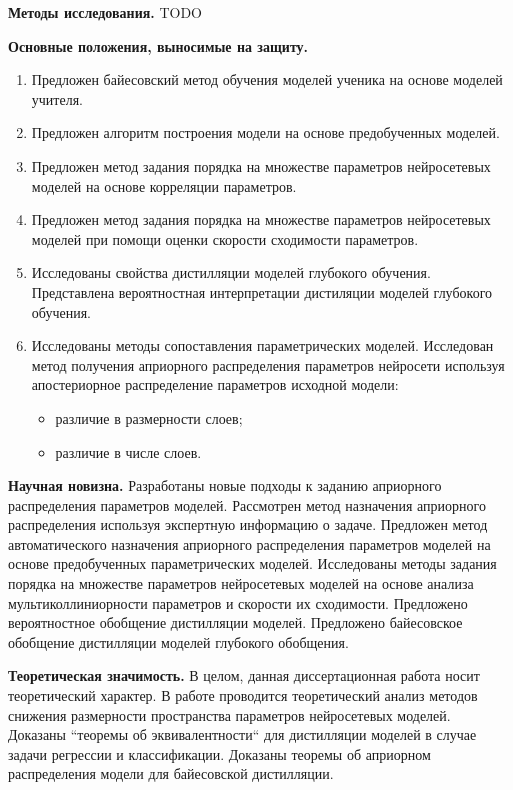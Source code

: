 \vspace{0.5cm}
\textbf{Методы исследования.} TODO

\vspace{0.5cm}
\textbf{Основные положения, выносимые на защиту.}
\vspace{0.3cm}
\begin{enumerate}
    \item Предложен байесовский метод обучения моделей ученика на основе моделей учителя.
    \item Предложен алгоритм построения модели на основе предобученных моделей.
    \item Предложен метод задания порядка на множестве параметров нейросетевых моделей на основе корреляции параметров.
    \item Предложен метод задания порядка на множестве параметров нейросетевых моделей при помощи оценки скорости сходимости параметров.
    \item Исследованы свойства дистилляции моделей глубокого обучения. Представлена вероятностная интерпретации дистиляции моделей глубокого обучения.
    \item Исследованы методы сопоставления параметрических моделей. Исследован метод получения априорного распределения параметров нейросети используя апостериорное распределение параметров исходной модели:
    \begin{itemize}
        \item различие в размерности слоев;
        \item различие в числе слоев.
    \end{itemize}
\end{enumerate}

\vspace{0.5cm}
\textbf{Научная новизна.} Разработаны новые подходы к заданию априорного распределения параметров моделей. Рассмотрен метод назначения априорного распределения используя экспертную информацию о задаче. Предложен метод автоматического назначения априорного распределения параметров моделей на основе предобученных параметрических моделей. Исследованы методы задания порядка на множестве параметров нейросетевых моделей на основе анализа мультиколлиниорности параметров и скорости их сходимости. Предложено вероятностное обобщение дистилляции моделей. Предложено байесовское обобщение дистилляции моделей глубокого обобщения.

\vspace{0.5cm}
\textbf{Теоретическая значимость.} В целом, данная диссертационная работа носит теоретический характер. В работе проводится теоретический анализ методов снижения размерности пространства параметров нейросетевых моделей. Доказаны ``теоремы об эквивалентности`` для дистилляции моделей в случае задачи регрессии и классификации. Доказаны теоремы об априорном распределения модели для байесовской дистилляции.

